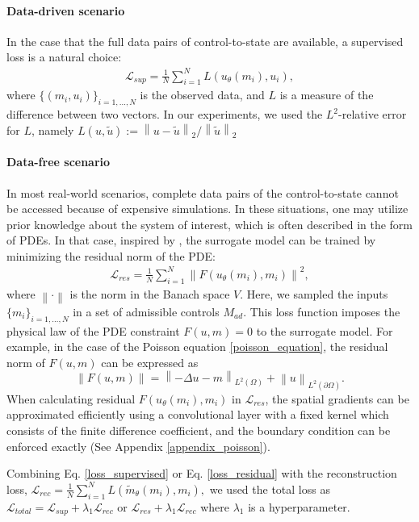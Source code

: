 \documentclass[letterpaper]{article}
\newcommand{\norm}[1]{\left\lVert#1\right\rVert}
\begin{document}
\paragraph{Data-driven scenario}
In the case that the full data pairs of control-to-state are available, a supervised loss is a natural choice:
\begin{align}\label{loss_supervised}
  \mathcal{L}_{sup} = \frac{1}{N}\sum_{i=1}^N L(u_\theta (m_i), u_{i}),
\end{align}
where $\{(m_i, u_{i})\}_{i=1,\dots,N}$ is the observed data, and $L$ is a measure of the difference between two vectors. In our experiments, we used the $L^2$-relative error for $L$, namely $
    L(u, \tilde{u}) := \norm{u - \tilde{u}}_2 / \norm{\tilde{u}}_2
$

\paragraph{Data-free scenario}
In most real-world scenarios, complete data pairs of the control-to-state cannot be accessed because of expensive simulations. In these situations, one may utilize prior knowledge about the system of interest, which is often described in the form of PDEs. In that case, inspired by \cite{zhu2019physics}, the surrogate model can be trained by minimizing the residual norm of the PDE:
\begin{align}\label{loss_residual}
  \mathcal{L}_{res} = \frac{1}{N}\sum_{i=1}^N \norm{F(u_\theta (m_i), m_i)}^2,
\end{align}
where $\norm{\cdot}$ is the norm in the Banach space $V$. Here, we sampled the inputs $\{m_i\}_{i=1,\dots,N}$ in a set of admissible controls $M_{ad}$. This loss function imposes the physical law of the PDE constraint $F(u, m)=0$ to the surrogate model. For example, in the case of the Poisson equation \eqref{poisson_equation}, the residual norm of $F(u, m)$ can be expressed as
\begin{equation}
   \norm{F(u, m)}=\norm{- \Delta u - m}_{L^2(\Omega)}+\norm{u}_{L^2(\partial\Omega)}.
\end{equation}
When calculating residual $F(u_\theta (m_i), m_i)$ in $\mathcal{L}_{res}$, the spatial gradients can be approximated efficiently using a convolutional layer with a fixed kernel which consists of the finite difference coefficient, and the boundary condition can be enforced exactly (See Appendix \ref{appendix_poisson}).

Combining Eq. \eqref{loss_supervised} or Eq. \eqref{loss_residual} with the reconstruction loss, $\mathcal{L}_{rec} = \frac{1}{N}\sum_{i=1}^N L(\tilde{m}_\theta(m_i), m_i ),$ we used the total loss as $\mathcal{L}_{total} = \mathcal{L}_{sup} + \lambda_1 \mathcal{L}_{rec}$ or $\mathcal{L}_{res} + \lambda_1 \mathcal{L}_{rec}$ where $\lambda_1$ is a hyperparameter.
\end{document}

